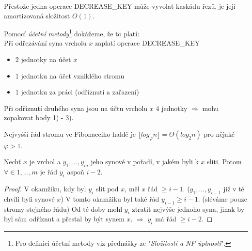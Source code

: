 \begin{pozn}
Přestože jedna operace DECREASE\_KEY může vyvolat kaskádu řezů, je její
amortizovaná složitost $O(1)$.
\end{pozn}

\begin{pozn}
Pomocí \emph{účetní metody}\footnote{Pro definici účetní metody viz
přednášky ze "\emph{Složitosti a NP úplnosti}".}
dokážeme, že to platí: \\
Při odřezávání syna vrcholu $x$ zaplatí operace DECREASE\_KEY
\begin{samepage}
\begin{itemize}
  \item 2 jednotky na účet $x$
  \item 1 jednotku na účet vzniklého stromu
  \item 1 jednotku za práci (odříznutí a zařazení)
\end{itemize}
\end{samepage}

Při odříznutí druhého syna jsou na účtu vrcholu $x$ 4 jednotky
$\Rightarrow$ mohu zopakovat body 1) - 3).
\end{pozn}

\begin{theorem}
\label{heaps.fib.theorem}
Nejvyšší řád stromu ve Fibonacciho haldě je $\lfloor log_\varphi n \rfloor =
\Theta(log_2 n)$ pro nějaké $\varphi > 1$.
\end{theorem}

\begin{lemma}
\label{heaps.fib.lemma}
Nechť $x$ je vrchol a $y_1, ..., y_m$ jeho synové v pořadí, v jakém byli k
$x$ sliti. Potom $\forall \in {1,...,m}$ je řád $y_i$ aspoň $i-2$.
\end{lemma}

\begin{proof}
V okamžiku, kdy byl $y_i$ slit pod $x$, měl $x$ řád $\geq i-1$.
($y_1,...,y_{i-1}$ již v té chvíli byli synové $x$)
V tomto okamžiku byl také řád $y_{i-1} \geq i-1$. (sléváme pouze stromy
stejného řádu) Od té doby mohl $y_i$ ztratit nejvýše jednoho syna, jinak
by byl sám odříznut a přestal by být synem $x$. $\Rightarrow$ $y_i$ má řád
$\geq i-2$. 
\end{proof}


